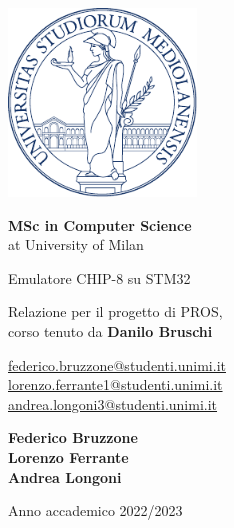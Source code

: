 \documentclass[a4paper]{article}
\begin{document}
\begin{titlepage}
    \begin{center}
        \includegraphics[height=5cm]{minerva.pdf}

        \vspace*{1.75cm}

        \LARGE

        \textbf{MSc in Computer Science} \\
        at University of Milan

        \vspace*{1cm}

        \huge
        Emulatore CHIP-8 su STM32

        \large Relazione per il progetto di PROS, \\
        corso tenuto da \textbf{Danilo Bruschi}

        \normalsize
        \vspace*{4cm}

        \begin{minipage}[t]{0.47\textwidth}
            {\large \href{federico.bruzzone@studenti.unimi.it}{federico.bruzzone@studenti.unimi.it}} \vspace{1em}  \\
            {\large \href{lorenzo.ferrante1@studenti.unimi.it}{lorenzo.ferrante1@studenti.unimi.it}} \vspace{1em}  \\
            {\large \href{andrea.longoni3@studenti.unimi.it}{andrea.longoni3@studenti.unimi.it}} \vspace{1em}  \\
        \end{minipage}
        \hfill
        \begin{minipage}[t]{0.47\textwidth}\raggedleft
            {\large \textbf{Federico Bruzzone}} \\
            \vspace{1em}
            {\large \textbf{Lorenzo Ferrante}} \\
            \vspace{1em}
            {\large \textbf{Andrea Longoni}}
        \end{minipage}

        \vfill
        Anno accademico 2022/2023

    \end{center}
\end{titlepage}
\setlength{\parindent}{0pt}
\setlength{\parskip}{0.8em}
\end{document}
